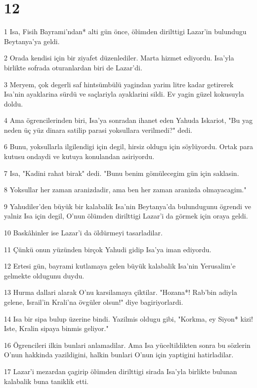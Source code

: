 \chapter{12}

\par 1 Isa, Fisih Bayrami'ndan* alti gün önce, ölümden dirilttigi Lazar'in bulundugu Beytanya'ya geldi.
\par 2 Orada kendisi için bir ziyafet düzenlediler. Marta hizmet ediyordu. Isa'yla birlikte sofrada oturanlardan biri de Lazar'di.
\par 3 Meryem, çok degerli saf hintsümbülü yagindan yarim litre kadar getirerek Isa'nin ayaklarina sürdü ve saçlariyla ayaklarini sildi. Ev yagin güzel kokusuyla doldu.
\par 4 Ama ögrencilerinden biri, Isa'ya sonradan ihanet eden Yahuda Iskariot, "Bu yag neden üç yüz dinara satilip parasi yoksullara verilmedi?" dedi.
\par 6 Bunu, yoksullarla ilgilendigi için degil, hirsiz oldugu için söylüyordu. Ortak para kutusu ondaydi ve kutuya konulandan asiriyordu.
\par 7 Isa, "Kadini rahat birak" dedi. "Bunu benim gömülecegim gün için saklasin.
\par 8 Yoksullar her zaman aranizdadir, ama ben her zaman aranizda olmayacagim."
\par 9 Yahudiler'den büyük bir kalabalik Isa'nin Beytanya'da bulundugunu ögrendi ve yalniz Isa için degil, O'nun ölümden dirilttigi Lazar'i da görmek için oraya geldi.
\par 10 Baskâhinler ise Lazar'i da öldürmeyi tasarladilar.
\par 11 Çünkü onun yüzünden birçok Yahudi gidip Isa'ya iman ediyordu.
\par 12 Ertesi gün, bayrami kutlamaya gelen büyük kalabalik Isa'nin Yerusalim'e gelmekte oldugunu duydu.
\par 13 Hurma dallari alarak O'nu karsilamaya çiktilar. "Hozana*! Rab'bin adiyla gelene, Israil'in Krali'na övgüler olsun!" diye bagiriyorlardi.
\par 14 Isa bir sipa bulup üzerine bindi. Yazilmis oldugu gibi, "Korkma, ey Siyon* kizi! Iste, Kralin sipaya binmis geliyor."
\par 16 Ögrencileri ilkin bunlari anlamadilar. Ama Isa yüceltildikten sonra bu sözlerin O'nun hakkinda yazildigini, halkin bunlari O'nun için yaptigini hatirladilar.
\par 17 Lazar'i mezardan çagirip ölümden dirilttigi sirada Isa'yla birlikte bulunan kalabalik buna taniklik etti.
